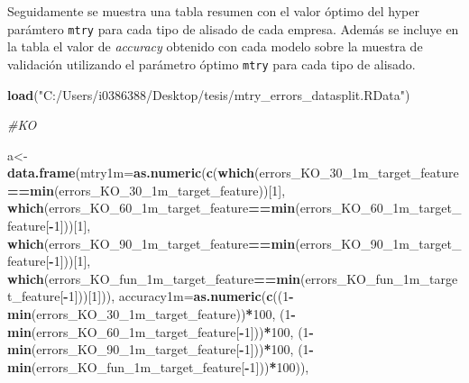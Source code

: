 \documentclass[]{article}
\newenvironment{Shaded}{\begin{snugshade}}{\end{snugshade}}
\newcommand{\KeywordTok}[1]{\textcolor[rgb]{0.13,0.29,0.53}{\textbf{#1}}}
\newcommand{\DataTypeTok}[1]{\textcolor[rgb]{0.13,0.29,0.53}{#1}}
\newcommand{\DecValTok}[1]{\textcolor[rgb]{0.00,0.00,0.81}{#1}}
\newcommand{\StringTok}[1]{\textcolor[rgb]{0.31,0.60,0.02}{#1}}
\newcommand{\CommentTok}[1]{\textcolor[rgb]{0.56,0.35,0.01}{\textit{#1}}}
\newcommand{\OperatorTok}[1]{\textcolor[rgb]{0.81,0.36,0.00}{\textbf{#1}}}
\newcommand{\NormalTok}[1]{#1}
\begin{document}
\setlength\parskip{5ex} Seguidamente se muestra una tabla resumen con el
valor óptimo del hyper parámtero \texttt{mtry} para cada tipo de alisado
de cada empresa. Además se incluye en la tabla el valor de
\emph{accuracy} obtenido con cada modelo sobre la muestra de validación
utilizando el parámetro óptimo \texttt{mtry} para cada tipo de alisado.

\begin{Shaded}
\begin{Highlighting}[]
\KeywordTok{load}\NormalTok{(}\StringTok{"C:/Users/i0386388/Desktop/tesis/mtry_errors_datasplit.RData"}\NormalTok{)}
\end{Highlighting}
\end{Shaded}

\begin{Shaded}
\begin{Highlighting}[]
\CommentTok{#KO}

\NormalTok{a<-}\KeywordTok{data.frame}\NormalTok{(}\DataTypeTok{mtry1m=}\KeywordTok{as.numeric}\NormalTok{(}\KeywordTok{c}\NormalTok{(}\KeywordTok{which}\NormalTok{(errors_KO_30_1m_target_feature}\OperatorTok{==}\KeywordTok{min}\NormalTok{(errors_KO_30_1m_target_feature))[}\DecValTok{1}\NormalTok{],}
                                    \KeywordTok{which}\NormalTok{(errors_KO_60_1m_target_feature}\OperatorTok{==}\KeywordTok{min}\NormalTok{(errors_KO_60_1m_target_feature[}\OperatorTok{-}\DecValTok{1}\NormalTok{]))[}\DecValTok{1}\NormalTok{],}
                                   \KeywordTok{which}\NormalTok{(errors_KO_90_1m_target_feature}\OperatorTok{==}\KeywordTok{min}\NormalTok{(errors_KO_90_1m_target_feature[}\OperatorTok{-}\DecValTok{1}\NormalTok{]))[}\DecValTok{1}\NormalTok{],}
                                   \KeywordTok{which}\NormalTok{(errors_KO_fun_1m_target_feature}\OperatorTok{==}\KeywordTok{min}\NormalTok{(errors_KO_fun_1m_target_feature[}\OperatorTok{-}\DecValTok{1}\NormalTok{]))[}\DecValTok{1}\NormalTok{])),}
              \DataTypeTok{accuracy1m=}\KeywordTok{as.numeric}\NormalTok{(}\KeywordTok{c}\NormalTok{((}\DecValTok{1}\OperatorTok{-}\KeywordTok{min}\NormalTok{(errors_KO_30_1m_target_feature))}\OperatorTok{*}\DecValTok{100}\NormalTok{,}
\NormalTok{                                    (}\DecValTok{1}\OperatorTok{-}\KeywordTok{min}\NormalTok{(errors_KO_60_1m_target_feature[}\OperatorTok{-}\DecValTok{1}\NormalTok{]))}\OperatorTok{*}\DecValTok{100}\NormalTok{,}
\NormalTok{                                    (}\DecValTok{1}\OperatorTok{-}\KeywordTok{min}\NormalTok{(errors_KO_90_1m_target_feature[}\OperatorTok{-}\DecValTok{1}\NormalTok{]))}\OperatorTok{*}\DecValTok{100}\NormalTok{,}
\NormalTok{                                    (}\DecValTok{1}\OperatorTok{-}\KeywordTok{min}\NormalTok{(errors_KO_fun_1m_target_feature[}\OperatorTok{-}\DecValTok{1}\NormalTok{]))}\OperatorTok{*}\DecValTok{100}\NormalTok{)),}
              

\end{Highlighting}
\end{Shaded}
\end{document}
